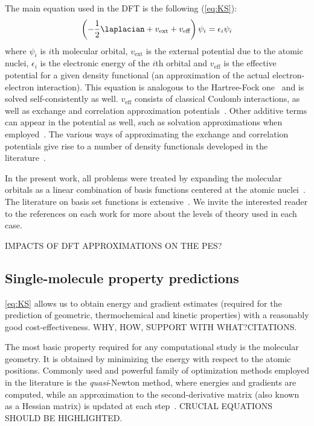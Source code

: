 The main equation used in the DFT is the following (\cref{eq:KS}):
%
\begin{equation}
	\left(-\frac{1}{2} \laplacian
	+ v_\text{ext}
	+ v_\text{eff}
	\right) \psi_i
	= \epsilon_i \psi_i
	\label{eq:KS}
\end{equation}
%
where $\psi_i$ is $i$th molecular orbital,
$v_\text{ext}$ is the external
potential due to the atomic nuclei,
$\epsilon_i$ is the electronic energy
of the $i$th orbital and $v_\text{eff}$ is the effective potential for a given
density functional (an approximation of the actual electron-electron
interaction).
This equation is analogous to the Hartree-Fock one~\cite{Szabo_1996}
and is solved self-consistently as well.
$v_\text{eff}$ consists of classical Coulomb interactions,
as well as exchange
and correlation approximation
potentials~\cite{Perdew_2014,Kryachko_2014,Yu_2016}.
Other additive terms can appear in the potential as well,
such as solvation
approximations when employed~\cite{Marenich_2009,Marenich_2012}.
The various ways of approximating the exchange and correlation potentials give
rise to a number of density functionals developed in the
literature~\cite{Chai_2008a,Chai_2008b,Goerigk_2011,Arago_2011,Salzner_2011,Burns_2011,Minenkov_2012,DFT2016_poll}.

In the present work,
all problems were treated by expanding the molecular
orbitals as a linear combination of basis functions centered at the atomic
nuclei~\cite{Szabo_1996,Helgaker_1997,Jensen_2012,Hill_2012}.
The literature on basis set functions is extensive~\cite{Ditchfield_1971,Hehre_1972,Hariharan_1973,Hariharan_1974,Gordon_1980,Francl_1982,Clark_1983,Frisch_1984,Binning_1990,Blaudeau_1997,Rassolov_1998,Rassolov_2001}.
We invite the interested reader to the references on each work for more about
the levels of theory used in each case.

IMPACTS OF DFT APPROXIMATIONS ON THE PES?\@

\subsection{Single-molecule property predictions}%
\label{sec:optimizations}

\cref{eq:KS} allows us to obtain energy and gradient estimates (required for
the prediction of geometric,
thermochemical and kinetic properties) with a
reasonably good cost-effectiveness.
WHY,
HOW,
SUPPORT WITH WHAT?\@ CITATIONS.\@

The most basic property required for any computational study is the molecular
geometry.
It is obtained by minimizing the energy with respect to the atomic positions.
Commonly used and powerful family of optimization methods employed in the
literature is the \emph{quasi}-Newton method,
where energies and gradients are
computed,
while an approximation to the second-derivative matrix (also known as
a Hessian matrix) is updated at each step~\cite{Banerjee_1985,Schlegel_1987}.
CRUCIAL EQUATIONS SHOULD BE HIGHLIGHTED.\@

